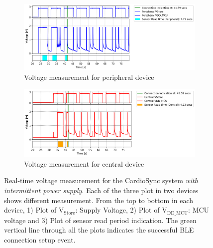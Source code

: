 \begin{figure}[ht]
    \begin{subfigure}{1\linewidth}
        \centering
        \includegraphics[width=1\linewidth]{chapters/Results/Connection_cardiosync_intermittent_peripheral.png}
        \caption{Voltage measurement for peripheral device}
        \label{fig:intermittent_connection_cardiosync_peripheral}
        \vspace{1\baselineskip}
    \end{subfigure}
    \begin{subfigure}{1\linewidth}
        \centering
        \includegraphics[width=1\linewidth]{chapters/Results/Connection_cardiosync_intermittent_central.png}
        \caption{Voltage measurement for central device}
        \label{fig:intermittent_connection_cardiosync_central}
    \end{subfigure}
    \caption{Real-time voltage measurement for the CardioSync system \textit{with intermittent power supply}. Each of the three plot in two devices shows different measurement. From the top to bottom in each device, 1) Plot of \(\text{V}_\text{Store}\): Supply Voltage, 2) Plot of \(\text{V}_\text{DD\_MCU}\): MCU voltage and 3) Plot of sensor read period indication. The green vertical line through all the plots indicates the successful BLE connection setup event.}
    \label{fig:intermittent_connection_cardiosync}
\end{figure}

